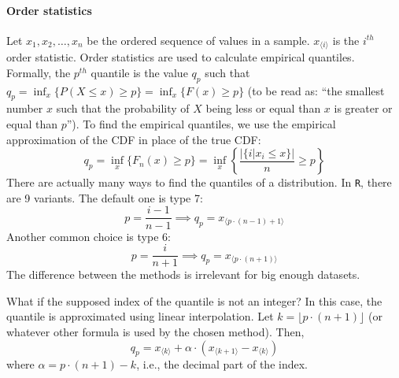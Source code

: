 \paragraph{Order statistics} Let $x_1, x_2, \ldots, x_n$ be the ordered sequence of values in a sample. $x_{\langle i \rangle}$ is the $i^{th}$ order statistic. Order statistics are used to calculate empirical quantiles. Formally, the $p^{th}$ quantile is the value $q_p$ such that $q_p = \inf_x \{ P(X \leq x) \geq p \} = \inf_x \{F(x) \geq p\}$ (to be read as: ``the smallest number $x$ such that the probability of $X$ being less or equal than $x$ is greater or equal than $p$''). To find the empirical quantiles, we use the empirical approximation of the CDF in place of the true CDF:
\[
    q_p = \inf_x \{ F_n(x) \geq p \} = \inf_x \left\{\frac{|\{i | x_i \leq x \}|}{n} \geq p \right\}
\]
There are actually many ways to find the quantiles of a distribution. In \texttt{R}, there are 9 variants. The default one is type 7:
\begin{equation*}
    p = \frac{i-1}{n-1} \implies q_p = x_{\langle p\cdot(n-1) + 1 \rangle}
\end{equation*}
Another common choice is type 6:
\begin{equation*}
    p = \frac{i}{n+1} \implies q_p = x_{\langle p \cdot (n+1) \rangle}
\end{equation*}
The difference between the methods is irrelevant for big enough datasets.

What if the supposed index of the quantile is not an integer? In this case, the quantile is approximated using linear interpolation. Let $k = \lfloor p \cdot (n+1) \rfloor$ (or whatever other formula is used by the chosen method). Then,
\begin{equation*}
    q_p = x_{\langle k \rangle} + \alpha \cdot (x_{\langle k+1 \rangle} - x_{\langle k \rangle})
\end{equation*}
where $\alpha = p \cdot (n+1) - k$, i.e., the decimal part of the index.

